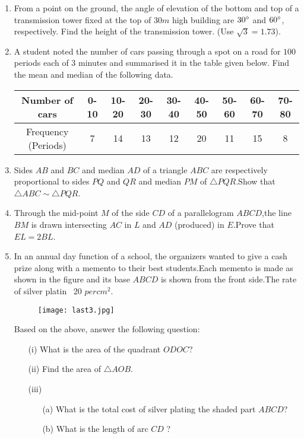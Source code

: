 \documentclass{article}
\begin{document}
\begin{enumerate}
\item From a point on the ground, the angle of elevation of the bottom and top of a transmission tower fixed at the top of $30 m$ high building are $30\degree$ and $60\degree$, respectively. Find the height of the transmission tower. (Use $\sqrt{3} = 1.73$).

\item A student noted the number of cars passing through a spot on a road for $100$ periods each of $3$ minutes and summarised it in the table given below. Find the mean and median of the following data.\\

	\begin{tabular}{|c|c|c|c|c|c|c|c|c|}
\hline
Number of cars & 0-10 & 10-20 & 20-30 & 30-40 & 40-50 & 50-60 & 60-70 & 70-80\\ 
\hline
Frequency (Periods) & 7 & 14 & 13 & 12 & 20 & 11 & 15 & 8\\ 
\hline

\end{tabular}

\item Sides $AB$ and $BC$ and median $AD$ of a triangle $ABC$ are respectively proportional to sides $PQ$ and $QR$ and median $PM$ of $\triangle PQR$.Show that $\triangle ABC \sim \triangle PQR$.

\item Through the mid-point $M$ of the side $CD$ of a parallelogram $ABCD$,the line $BM$ is drawn intersecting $AC$ in $L$ and $AD$ (produced) in $E$.Prove that $EL = 2BL$. 

\item In an annual day function of a school, the organizers wanted to give a cash prize along with a memento to their best students.Each memento is made as shown in the figure and its base $ABCD$ is shown from the front side.The rate of silver platin \rupee~20 $per  cm^2$.

	\begin{figure}[!ht]
		\centering
		\texttt{[image: last3.jpg]}
		\caption{}
		\label{fig:enter-label}
	\end{figure}


	\text Based on the above, answer the following question:
		\begin{enumerate}
			\item[(i) ] What is the area of the quadrant $ODOC$?
			\item[(ii) ] Find the area of $\triangle AOB$.
			\item[(iii)]
			\begin{enumerate}
				\item[(a)] What is the total cost of silver plating the shaded part $ABCD$?
				\item[(b)] What is the length of arc $CD$ ?
			\end{enumerate}
		\end{enumerate}


\end{enumerate}
\end{document}
